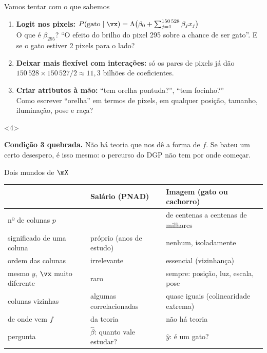 \documentclass[aspectratio=169,11pt]{beamer}
\begin{document}
\begin{frame}{Vamos tentar com o que sabemos}
  \begin{enumerate}
    \item<1-> \textbf{Logit nos pixels:}
          $P(\text{gato}\mid\vx) = \Lambda\big(\beta_0 + \sum_{j=1}^{150\,528}\beta_j x_j\big)$\\
          \small O que é $\beta_{295}$? ``O efeito do brilho do pixel 295 sobre a
          chance de ser gato''. E se o gato estiver 2 pixels para o lado?
          \normalsize
    \item<2-> \textbf{Deixar mais flexível com interações:} só os pares de pixels
          já dão $150\,528 \times 150\,527 / 2 \approx 11{,}3$ \alert{bilhões} de
          coeficientes.
    \item<3-> \textbf{Criar atributos à mão:} ``tem orelha pontuda?'',
          ``tem focinho?''\\
          \small Como escrever ``orelha'' em termos de pixels, em qualquer
          posição, tamanho, iluminação, pose e raça?\normalsize
  \end{enumerate}
  \begin{onlyenv}<4>
  \begin{atencao}
    \small \textbf{Condição 3 quebrada.} Não há teoria que nos dê a forma de
    $f$. Se bateu um certo desespero, é isso mesmo: o percurso do DGP
    \alert{não tem por onde começar}.
  \end{atencao}
  \end{onlyenv}
\end{frame}

\begin{frame}{Dois mundos de $\mX$}
  \centering\small
  \begin{tabular}{@{}>{\raggedright\arraybackslash}p{}
                    >{\raggedright\arraybackslash}p{}
                    >{\raggedright\arraybackslash}p{}@{}}
    \toprule
    & Salário (PNAD) & Imagem (gato ou cachorro) \\
    \midrule
    nº de colunas $p$              & 4                       & de centenas a centenas de milhares \\
    significado de uma coluna      & próprio (anos de estudo) & nenhum, isoladamente \\
    ordem das colunas              & irrelevante             & essencial (vizinhança) \\
    mesmo $y$, $\vx$ muito diferente & raro                  & sempre: posição, luz, escala, pose \\
    colunas vizinhas               & algumas correlacionadas & quase iguais (colinearidade extrema) \\
    de onde vem $f$                & da teoria               & não há teoria \\
    pergunta                       & $\hat\beta$: quanto vale estudar? & $\hat y$: é um gato? \\
    \bottomrule
  \end{tabular}
\end{frame}
\end{document}
